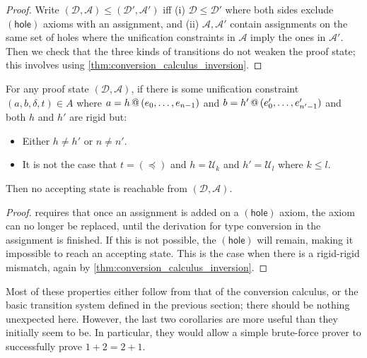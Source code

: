 \documentclass[twoside]{report}
\begin{document}
\begin{proof}
    Write $(\mathcal D, \mathcal A) \leq (\mathcal D', \mathcal A')$ iff (i) $\mathcal D \leq \mathcal D'$ where both sides exclude $(\mathsf{hole})$ axioms with an assignment, and (ii) $\mathcal A, \mathcal A'$ contain assignments on the same set of holes where the unification constraints in $\mathcal A$ imply the ones in $\mathcal A'$. Then we check that the three kinds of transitions do not weaken the proof state; this involves using \cref{thm:conversion_calculus_inversion}.
\end{proof}

\begin{proposition}
    \label{thm:tableau_states_unprovable_with_constraints}
    For any proof state $(\mathcal D, \mathcal A)$, if there is some unification constraint $(a, b, \delta, t) \in A$ where $a = {h}\,@\,({e_0, \ldots, e_{n-1}})$ and $b = {h'}\,@\,({e'_0, \ldots, e'_{n'-1}})$ and both $h$ and $h'$ are rigid but:
    \begin{itemize}[noitemsep]
        \item Either $h \neq h'$ or $n \neq n'$.
        \item It is not the case that $t = (\preceq)$ and $h = \mathcal U_k$ and $h' = \mathcal U_l$ where $k \leq l$.
    \end{itemize}
    Then no accepting state is reachable from $(\mathcal D, \mathcal A)$.
\end{proposition}

\begin{proof}
     requires that once an assignment is added on a $(\mathsf{hole})$ axiom, the axiom can no longer be replaced, until the derivation for type conversion in the assignment is finished. If this is not possible, the $(\mathsf{hole})$ will remain, making it impossible to reach an accepting state. This is the case when there is a rigid-rigid mismatch, again by \cref{thm:conversion_calculus_inversion}.
\end{proof}

Most of these properties either follow from that of the conversion calculus, or the basic transition system defined in the previous section; there should be nothing unexpected here. However, the last two corollaries are more useful than they initially seem to be. In particular, they would allow a simple brute-force prover to successfully prove $1 + 2 = 2 + 1$.
\end{document}
